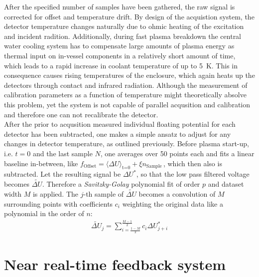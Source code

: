 \documentclass[
    aps,%
    twocolumn,%
    secnumarabic,%
    amssymb,%
    prd,%
    10pt%
    ]{revtex4-1}
\newcommand{\diff}{\text{d}}
\newcommand{\ix}[1]{_\text{#1}}
\newcommand{\tilt}[1]{\textit{#1}}
\begin{document}
    After the specified number of samples have been gathered, the raw signal is corrected for offset and temperature drift. By design of the acquistion system, the detector temperature changes naturally due to ohmic heating of the excitation and incident radition. Additionally, during fast plasma breakdown the central water cooling system has to compensate large amounts of plasma energy as thermal input on in-vessel components in a relatively short amount of time, which leads to a rapid increase in coolant temperature of up to \SI{5}{\kelvin}. This in consequence causes rising temperatures of the enclosure, which again heats up the detectors through contact and infrared radiation. Although the measurement of calibration parameters as a function of temperature might theoretically absolve this problem, yet the system is not capable of parallel acqusition and calibration and therefore one can not recalibrate the detector.\\%
    After the prior to acqusition measured individual floating potential for each detector has been subtracted, one makes a simple ansatz to adjust for any changes in detector temperature, as outlined previously. Before plasma start-up, i.e. $t=0$ and the last sample $N$, one averages over 50 points each and fits a linear baseline in-between, like \mbox{$f\ix{Offset}=\langle\Delta U\rangle\ix{t=0}+\xi n\ix{Sample}\,$,} which then also is subtracted. Let the resulting signal be $\Delta U^{*}$, so that the low pass filtered voltage becomes $\widetilde{\Delta U}$. Therefore a \tilt{Savitzky-Golay} polynomial fit of order $p$ and dataset width $M$ is applied. The $j$-th sample of $\widetilde{\Delta U}$ becomes a convolution of $M$ surrounding points with coefficients $c_{i}$ weighting the original data like a polynomial in the order of $n$:
    \begin{align}
        \widetilde{\Delta U}_{j}=\sum_{i=\frac{1-M}{2}}^{\frac{M-1}{2}}%
            c_{i}\Delta U^{*}_{j+i}
    \end{align}
%
\section{Near real-time feedback system}\label{sec:feedback}
%

%
\end{document}
